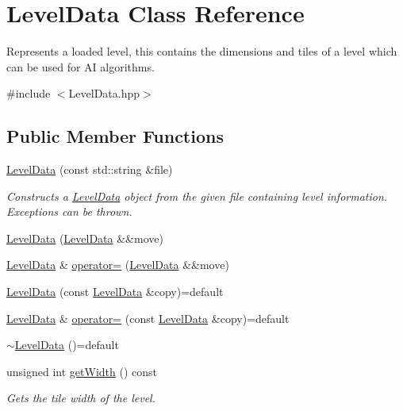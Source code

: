 \hypertarget{classLevelData}{\section{Level\+Data Class Reference}
\label{classLevelData}
}


Represents a loaded level, this contains the dimensions and tiles of a level which can be used for A\+I algorithms.  




{\ttfamily \#include $<$Level\+Data.\+hpp$>$}

\subsection*{Public Member Functions}
\begin{DoxyCompactItemize}
\item 
\hyperlink{classLevelData_a278138fae5c623551b7b90c28e75f056}{Level\+Data} (const std\+::string \&file)
\begin{DoxyCompactList}\small\item\em Constructs a \hyperlink{classLevelData}{Level\+Data} object from the given file containing level information. Exceptions can be thrown. \end{DoxyCompactList}\item 
\hyperlink{classLevelData_af56cf70c4f4991db88ac77c5c2e5b2c5}{Level\+Data} (\hyperlink{classLevelData}{Level\+Data} \&\&move)
\item 
\hyperlink{classLevelData}{Level\+Data} \& \hyperlink{classLevelData_aa979caad1a51d2dd77d5cf6b88c83484}{operator=} (\hyperlink{classLevelData}{Level\+Data} \&\&move)
\item 
\hyperlink{classLevelData_a3ca3249521b88b01f2aab308ce1c3097}{Level\+Data} (const \hyperlink{classLevelData}{Level\+Data} \&copy)=default
\item 
\hyperlink{classLevelData}{Level\+Data} \& \hyperlink{classLevelData_a1ac815425733ec660357d3b594ecdffa}{operator=} (const \hyperlink{classLevelData}{Level\+Data} \&copy)=default
\item 
\hyperlink{classLevelData_a534a1a46628043bd85fcc4838ebe45cf}{$\sim$\+Level\+Data} ()=default
\item 
unsigned int \hyperlink{classLevelData_ad169e7a33905caaf20ad6057166f40c3}{get\+Width} () const 
\begin{DoxyCompactList}\small\item\em Gets the tile width of the level. \end{DoxyCompactList}\item 

\end{DoxyCompactItemize}
